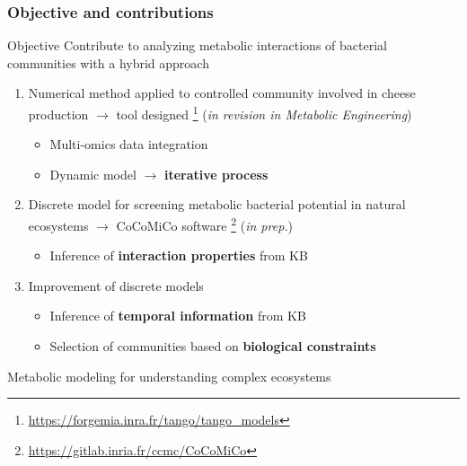 \documentclass[8pt,usenames,dvipsnames]{beamer}
\begin{document}
\begin{frame}
\frametitle{Objective and contributions}
\begin{block}{Objective}
 Contribute to analyzing metabolic interactions of bacterial communities with a hybrid approach
\end{block}

\begin{enumerate}
\item Numerical method applied to controlled community involved in cheese production $\rightarrow$ tool designed \footnote{\url{https://forgemia.inra.fr/tango/tango_models}} (\textit{in revision in Metabolic Engineering})
\begin{itemize}
\item Multi-omics data integration
\item Dynamic model $\rightarrow$ \textbf{iterative process}
\end{itemize}

\item Discrete model for screening metabolic bacterial potential in natural ecosystems $\rightarrow$ CoCoMiCo software \footnote{\url{https://gitlab.inria.fr/ccmc/CoCoMiCo}} (\textit{in prep.})

\begin{itemize}
\item Inference of \textbf{interaction properties} from KB
\end{itemize}

\item Improvement of discrete models

\begin{itemize}
\item Inference of \textbf{temporal information} from KB
\item Selection of communities based on \textbf{biological constraints} 
\end{itemize}
\end{enumerate}

\begin{alertblock}{}
\centering
Metabolic modeling for understanding complex ecosystems
\end{alertblock}

\end{frame}
\end{document}
